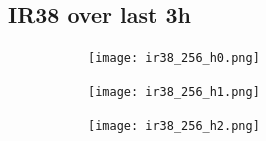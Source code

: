 \documentclass{article}
\begin{document}
\vspace{-1em}
\subsection*{IR38 over last 3h}
\vspace{-1em}
\begin{figure}[H]
    \centering
    \begin{subfigure}[b]{0.32\textwidth}
        \centering
        \texttt{[image: ir38\_256\_h0.png]} %
    \end{subfigure}
    \begin{subfigure}[b]{0.32\textwidth}
        \centering
        \texttt{[image: ir38\_256\_h1.png]} %
    \end{subfigure}
    \begin{subfigure}[b]{0.32\textwidth}
        \centering
        \texttt{[image: ir38\_256\_h2.png]} %
    \end{subfigure}
\end{figure}
\end{document}
